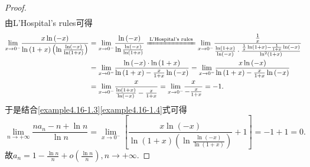 \documentclass[../../main.tex]{subfiles}%
\begin{document}
\begin{proof}
\begin{align}
\label{example4.16-1.3}
\end{align}
由L'Hospital's rules可得
\begin{align}
\underset{x\rightarrow 0^-}{\lim}\frac{x\ln \left( -x \right)}{\ln \left( 1+x \right) \left( \ln \frac{\ln \left( -x \right)}{\ln \left( 1+x \right)} \right)}&=\underset{x\rightarrow 0^-}{\lim}\frac{\ln \left( -x \right)}{\ln \frac{\ln \left( -x \right)}{\ln \left( 1+x \right)}}\xlongequal{\text{L'Hospital's rules}}\underset{x\rightarrow 0^-}{\lim}\frac{\frac{1}{x}}{\frac{\ln \left( 1+x \right)}{\ln \left( -x \right)}\cdot \frac{\frac{1}{x}\ln \left( 1+x \right) -\frac{1}{1+x}\ln \left( -x \right)}{\ln ^2\left( 1+x \right)}}\nonumber
\\
&=\underset{x\rightarrow 0^-}{\lim}\frac{\ln \left( -x \right) \cdot \ln \left( 1+x \right)}{\ln \left( 1+x \right) -\frac{x}{1+x}\ln \left( -x \right)}=\underset{x\rightarrow 0^-}{\lim}\frac{x\ln \left( -x \right)}{\ln \left( 1+x \right) -\frac{x}{1+x}\ln \left( -x \right)}\nonumber
\\
&=\underset{x\rightarrow 0^-}{\lim}\frac{x}{\frac{\ln \left( 1+x \right)}{\ln \left( -x \right)}-\frac{x}{1+x}}=\underset{x\rightarrow 0^-}{\lim}\frac{x}{-\frac{x}{1+x}}=-1.
\label{example4.16-1.4}
\end{align}
于是结合\eqref{example4.16-1.3}\eqref{example4.16-1.4}式可得
\[
\lim_{n\rightarrow +\infty}\frac{na_n - n + \ln n}{\ln n} = \lim_{x\rightarrow 0^-}\left[ \frac{x\ln(-x)}{\ln(1 + x)\left(\ln \frac{\ln(-x)}{\ln(1 + x)}\right)} + 1 \right] = -1 + 1 = 0.
\]
故\(a_n = 1 - \frac{\ln n}{n} + o\left(\frac{\ln n}{n}\right), n \rightarrow +\infty\).
\end{proof}
\end{document}
